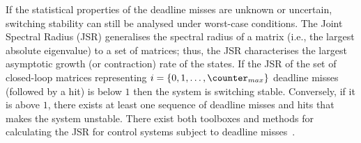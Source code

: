 If the statistical properties of the deadline misses are unknown or uncertain, switching stability can still be analysed under worst-case conditions.
The Joint Spectral Radius (JSR) generalises the spectral radius of a matrix (i.e., the largest absolute eigenvalue) to a set of matrices; thus, the JSR characterises the largest asymptotic growth (or contraction) rate of the states. %
If the JSR of the set of closed-loop matrices representing $i = \{0,1,\ldots,\counter_{max}\}$ deadline misses (followed by a hit) is below $1$ then the system is switching stable.
Conversely, if it is above $1$, there exists at least one sequence of deadline misses and hits that makes the system unstable.
There exist both toolboxes and methods for calculating the JSR for control systems subject to deadline misses~\cite{Jungers:2014, Maggio:2020, Vreman:2021}.
